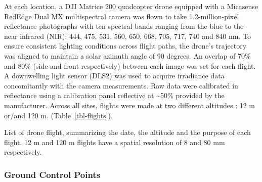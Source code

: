 \documentclass[
  number]{elsarticle}
\begin{document}
At each location, a DJI Matrice 200 quadcopter drone equipped with a
Micasense RedEdge Dual MX multispectral camera was flown to take
1.2-million-pixel reflectance photographs with ten spectral bands
ranging from the blue to the near infrared (NIR): 444, 475, 531, 560,
650, 668, 705, 717, 740 and 840 nm. To ensure consistent lighting
conditions across flight paths, the drone's trajectory was aligned to
maintain a solar azimuth angle of 90 degrees. An overlap of 70\% and
80\% (side and front respectively) between each image was set for each
flight. A downwelling light sensor (DLS2) was used to acquire irradiance
data concomitantly with the camera measurements. Raw data were
calibrated in reflectance using a calibration panel reflective at
\textasciitilde50\% provided by the manufacturer. Across all sites,
flights were made at two different altitudes : 12 m or/and 120 m.
(Table~\ref{tbl-flights}).

\begin{table}

\caption{\label{tbl-flights}List of drone flight, summarizing the date,
the altitude and the purpose of each flight. 12 m and 120 m flights have
a spatial resolution of 8 and 80 mm respectively.}


\end{table}%

\subsubsection{Ground Control Points}\label{ground-control-points}
\end{document}
